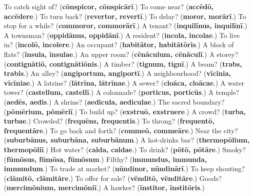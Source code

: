 \begin{tcolorbox}[breakable,colback=teal!4,colframe=teal!35!black,title={Before you move on}]
To catch sight of? (\textbf{cōnspicor, cōnspicārī}.) To come near? (\textbf{accēdō, accēdere}.) To turn back? (\textbf{revertor, revertī}.) To delay? (\textbf{moror, morārī}.) To stop for a while? (\textbf{commoror, commorārī}.) A tenant? (\textbf{inquilīnus, inquilīnī}.) A townsman? (\textbf{oppidānus, oppidānī}.) A resident? (\textbf{incola, incolae}.) To live in? (\textbf{incolō, incolere}.) An occupant? (\textbf{habitātor, habitātōris}.) A block of flats? (\textbf{īnsula, īnsulae}.) An upper room? (\textbf{cēnāculum, cēnāculī}.) A storey? (\textbf{contignātiō, contignātiōnis}.) A timber? (\textbf{tignum, tignī}.) A beam? (\textbf{trabs, trabis}.) An alley? (\textbf{angiportum, angiportī}.) A neighbourhood? (\textbf{vīcīnia, vīcīniae}.) A latrine? (\textbf{lātrīna, lātrīnae}.) A sewer? (\textbf{cloāca, cloācae}.) A water tower? (\textbf{castellum, castellī}.) A colonnade? (\textbf{porticus, porticūs}.) A temple? (\textbf{aedēs, aedis}.) A shrine? (\textbf{aedicula, aediculae}.) The sacred boundary? (\textbf{pōmērium, pōmēriī}.) To build up? (\textbf{exstruō, exstruere}.) A crowd? (\textbf{turba, turbae}.) Crowded? (\textbf{frequēns, frequentis}.) To throng? (\textbf{frequentō, frequentāre}.) To go back and forth? (\textbf{commeō, commeāre}.) Near the city? (\textbf{suburbānus, suburbāna, suburbānum}.) A hot-drinks bar? (\textbf{thermopōlium, thermopōliī}.) Hot water? (\textbf{calda, caldae}.) To drink? (\textbf{pōtō, pōtāre}.) Smoky? (\textbf{fūmōsus, fūmōsa, fūmōsum}.) Filthy? (\textbf{immundus, immunda, immundum}.) To trade at market? (\textbf{nūndinor, nūndinārī}.) To keep shouting? (\textbf{clāmitō, clāmitāre}.) To offer for sale? (\textbf{vēnditō, vēnditāre}.) Goods? (\textbf{mercimōnium, mercimōniī}.) A hawker? (\textbf{īnstitor, īnstitōris}.)
\end{tcolorbox}
